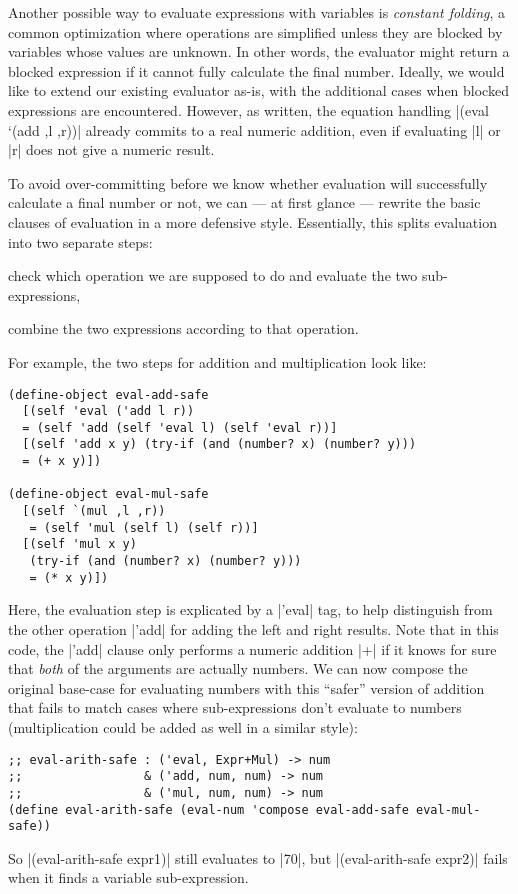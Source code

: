 Another possible way to evaluate expressions with variables is \emph{constant folding}, a common optimization where operations are simplified unless they are blocked by variables whose values are unknown.
In other words, the evaluator might return a blocked expression if it cannot fully calculate the final number.
Ideally, we would like to extend our existing evaluator as-is, with the additional cases when blocked expressions are encountered.  
However, as written, the equation handling \scm|(eval `(add ,l ,r))| already commits to a real numeric addition, even if evaluating \scm|l| or \scm|r| does not give a numeric result.

To avoid over-committing before we know whether evaluation will successfully calculate a final number or not, we can --- at first glance --- rewrite the basic clauses of evaluation in a more defensive style.
Essentially, this splits evaluation into two separate steps:
\begin{enumerate*}[(1)]
\item check which operation we are supposed to do and evaluate the two sub-expressions,
\item combine the two expressions according to that operation.
\end{enumerate*}
For example, the two steps for addition and multiplication look like:
\begin{verbatim} 
(define-object eval-add-safe
  [(self 'eval ('add l r))
  = (self 'add (self 'eval l) (self 'eval r))]
  [(self 'add x y) (try-if (and (number? x) (number? y)))
  = (+ x y)])

(define-object eval-mul-safe
  [(self `(mul ,l ,r))
   = (self 'mul (self l) (self r))]
  [(self 'mul x y)
   (try-if (and (number? x) (number? y)))
   = (* x y)])
\end{verbatim}
Here, the evaluation step is explicated by a \scm|'eval| tag, to help distinguish from the other operation \scm|'add| for adding the left and right results.
Note that in this code, the \scm|'add| clause only performs a numeric addition \scm|+| if it knows for sure that \emph{both} of the arguments are actually numbers.
We can now compose the original base-case for evaluating numbers with this ``safer'' version of addition that fails to match cases where sub-expressions don't evaluate to numbers (multiplication could be added as well in a similar style):
\begin{verbatim}
;; eval-arith-safe : ('eval, Expr+Mul) -> num
;;                 & ('add, num, num) -> num
;;                 & ('mul, num, num) -> num
(define eval-arith-safe (eval-num 'compose eval-add-safe eval-mul-safe))
\end{verbatim}
So \scm|(eval-arith-safe expr1)| still evaluates to \scm|70|, but \scm|(eval-arith-safe expr2)| fails when it finds a variable sub-expression.

